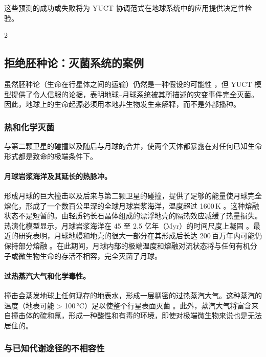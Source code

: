 \documentclass[11pt,a4paper]{article}
\begin{document}
		这些预测的成功或失败将为 YUCT 协调范式在地球系统中的应用提供决定性检验。
		
		\begin{multicols}{2}
		
		\subsection{拒绝胚种论：灭菌系统的案例}
		
		虽然胚种论（生命在行星体之间的运输）仍然是一种假设的可能性 \cite{PanspermiaReview}，但 YUCT 模型提供了令人信服的论据，表明地球–月球系统被其所描述的灾变事件完全灭菌。因此，地球上的生命起源必须用本地非生物发生来解释，而不是外部播种。
		
		\subsubsection{热和化学灭菌}
		
		与第二颗卫星的碰撞以及随后与月球的合并，使两个天体都暴露在对任何已知生命形式都是致命的极端条件下。
		
		\paragraph{月球岩浆海洋及其延长的热脉冲。}
		形成月球的巨大撞击以及后来与第二颗卫星的碰撞，提供了足够的能量使月球完全熔化，形成了一个数百公里深的全球月球岩浆海洋，温度超过 1600 K \cite{Sahijpal2020}。这种熔融状态不是短暂的。由轻质钙长石晶体组成的漂浮地壳的隔热效应减缓了热量损失。热演化模型显示，月球岩浆海洋在 45 至 2.5 亿年（Myr）的时间尺度上凝固 \cite{Colin2024, Maurice2018}。最近的研究表明，月球地幔和地壳的很大一部分在其形成后长达 200 百万年内可能仍保持部分熔融 \cite{Maurice2020}。在此期间，月球内部的极端温度和熔融对流状态将与任何有机分子或微生物生命的存活不相容，完全灭菌了月球。
		
		\paragraph{过热蒸汽大气和化学毒性。}
		撞击会蒸发地球上任何现存的地表水，形成一层稠密的过热蒸汽大气。这种蒸汽的温度（地表可能 > 100 °C）足以使整个行星表面灭菌 \cite{Zahnle2015}。此外，蒸汽大气将富含来自撞击体的硫和氯，形成一种酸性和有毒的环境，即使对极端微生物来说也是无法居住的。
		
		\subsubsection{与已知代谢途径的不相容性}
		

\end{multicols}
\end{document}
